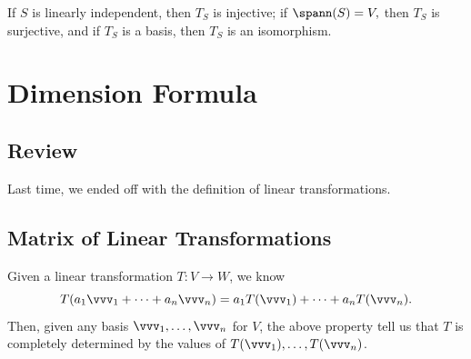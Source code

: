 If $S$ is linearly independent, then $T_S$ is injective; if $\spann(S) = V,$ then $T_S$ is surjective, and if $T_S$ is a basis, then $T_S$ is an isomorphism.

\newpage


\section{Dimension Formula}
\subsection{Review}
Last time, we ended off with the definition of linear transformations.
\subsection{Matrix of Linear Transformations}
Given a linear transformation $T: V \rightarrow W$, we know 
\[ T(a_1 \vvv_1 + \cdots + a_n \vvv_n) = a_1 T(\vvv_1) + \cdots + a_n T(\vvv_n) .\]
Then, given any basis $\vvv_1, \ldots , \vvv_n$ for $V$, the above property tell us that $T$ is completely determined by the values of $T(\vvv_1), \ldots, T(\vvv_n)$. 

